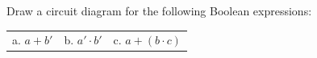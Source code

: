 \documentclass[a4paper,12pt]{book}
\newcounter{question}
\begin{document}
        \hrulefill
		
        \begin{questionNOGRADE}{\thequestion}
			
			Draw a circuit diagram for the following Boolean expressions:
			
			\begin{tabular}{p{4cm} p{4cm} p{4cm}}
				a. $a + b'$ &
				b. $a' \cdot b'$ &
				c. $a + (b \cdot c)$
			\end{tabular}

			
        \end{questionNOGRADE}
        
        
        
\end{document}
